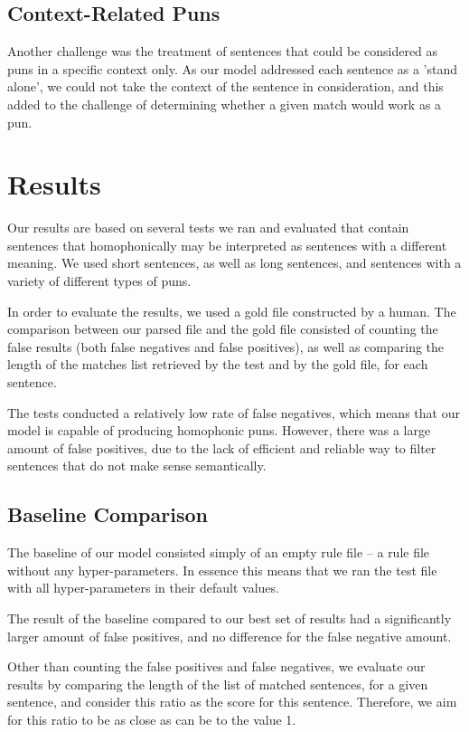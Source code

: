 \documentclass[11pt,a4paper]{article}
\begin{document}
\subsection{Context-Related Puns}
Another challenge was the treatment of sentences that could be considered as puns in a specific context only. As our model addressed each sentence as a 'stand alone', we could not take the context of the sentence in consideration, and this added to the challenge of determining whether a given match would work as a pun.

\section{Results}
Our results are based on several tests we ran and evaluated that contain sentences that homophonically may be interpreted as sentences with a different meaning. We used short sentences, as well as long sentences, and sentences with a variety of different types of puns.

In order to evaluate the results, we used a gold file constructed by a human. The comparison between our parsed file and the gold file consisted of counting the false results (both false negatives and false positives), as well as comparing the length of the matches list retrieved by the test and by the gold file, for each sentence.

The tests conducted a relatively low rate of false negatives, which means that our model is capable of producing homophonic puns. However, there was a large amount of false positives, due to the lack of efficient and reliable way to filter sentences that do not make sense semantically.

\subsection{Baseline Comparison}
The baseline of our model consisted simply of an empty rule file -- a rule file without any hyper-parameters. In essence this means that we ran the test file with all hyper-parameters in their default values.

The result of the baseline compared to our best set of results had a significantly larger amount of false positives, and no difference for the false negative amount.

Other than counting the false positives and false negatives, we evaluate our results by comparing the length of the list of matched sentences, for a given sentence, and consider this ratio as the score for this sentence. Therefore, we aim for this ratio to be as close as can be to the value 1. 
\end{document}
